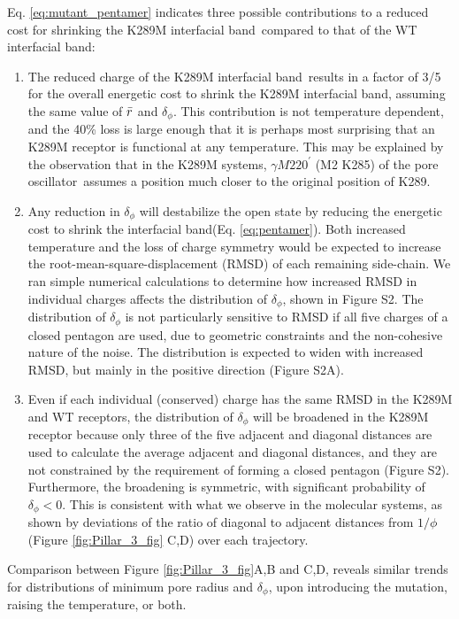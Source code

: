 \documentclass[journal=jacsat,manuscript=article]{achemso}
\newcommand{\sfigDeltaPhiDist}{S2}
\newcommand{\fivering}{interfacial band~}
\newcommand{\fiveringnos}{interfacial band}
\newcommand{\triad}{pore oscillator~}
\newcommand{\WT}{WT\xspace}
\newcommand{\MT}{K289M\xspace}
\begin{document}
Eq. \ref{eq:mutant_pentamer} indicates three possible contributions to a reduced cost for shrinking the \MT \fivering compared to that of the \WT \fiveringnos: 
\begin{enumerate}
\item The reduced charge of the \MT \fivering results in a factor of 3/5 for the overall energetic cost to shrink the \MT \fiveringnos, assuming the same value of $\bar{r}$ and $\delta_{\phi}$. This contribution is not temperature dependent, and the 40\% loss is large enough that it is perhaps most surprising that an \MT receptor is functional at any temperature. This may be explained by the observation that in the \MT systems, $\gamma M2 20^{\prime}$ (M2 K285) of the \triad assumes a position much closer to the original position of K289.   
\item  Any reduction in $\delta_{\phi}$ will destabilize the open state by reducing the energetic cost to shrink the \fiveringnos (Eq. \ref{eq:pentamer}).  Both increased temperature and the loss of charge symmetry would be expected to increase the root-mean-square-displacement (RMSD) of each remaining side-chain.  We ran simple numerical calculations to determine how increased RMSD in individual charges affects the distribution of $\delta_{\phi}$, shown in Figure \sfigDeltaPhiDist. The distribution of $\delta_{\phi}$ is not particularly sensitive to RMSD if all five charges of a closed pentagon are used, due to geometric constraints and the non-cohesive nature of the noise. The distribution is expected to widen with increased RMSD, but mainly in the positive direction (Figure \sfigDeltaPhiDist A). 
  \item Even if each individual (conserved) charge has the same RMSD in the \MT and \WT receptors, the distribution of $\delta_{\phi}$ will be broadened in the \MT receptor because only three of the five adjacent and diagonal distances are used to calculate the average adjacent and diagonal distances, and they are not constrained by the requirement of forming a closed pentagon (Figure \sfigDeltaPhiDist). Furthermore, the broadening is symmetric, with significant probability of $\delta_{\phi} < 0$. This is consistent with what we observe in the molecular systems, as shown by  deviations of the ratio of diagonal to adjacent distances from $1/\phi$ (Figure \ref{fig:Pillar_3_fig} C,D) over each trajectory.  
  \end{enumerate}
Comparison between Figure \ref{fig:Pillar_3_fig}A,B and C,D, reveals similar trends for distributions of minimum pore radius and $\delta_{\phi}$, upon introducing the mutation, raising the temperature, or both.   %
\end{document}
